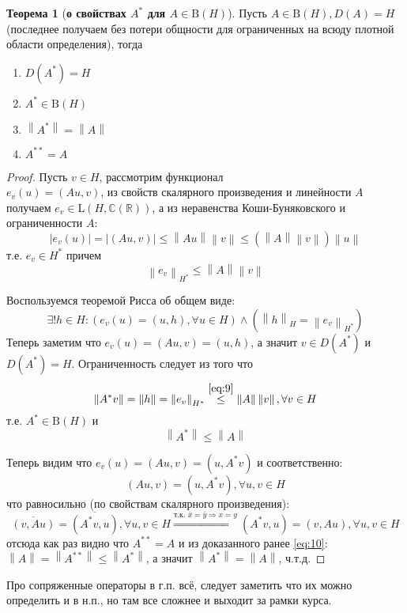 \documentclass[12pt,a4paper]{article}
\theoremstyle{definition}
\newtheorem{theorem}{Теорема}
\newcommand{\Real}{\mathbb{R}}
\newcommand{\Cmplx}{\mathbb{C}}
\newcommand{\norm}[1]{\left\lVert#1\right\rVert}
\newcommand{\boundedo}[1]{\textrm{B}(#1)}
\newcommand{\linear}[2]{\textrm{L}(#1, #2)}
\begin{document}
\begin{theorem}[\textbf{о свойствах $A^*$ для $A \in \boundedo{H}$}]
	Пусть $A \in \boundedo{H}, D(A) = H$ (последнее получаем без потери общности для ограниченных на всюду плотной области определения), тогда
	\begin{enumerate}
		\item $D(A^*) = H$
		\item $A^* \in \boundedo{H}$
		\item $\norm{A^*} = \norm{A}$
		\item $A^{**} = A$
	\end{enumerate}
\end{theorem}
\begin{proof}
	Пусть $v \in H$, рассмотрим функционал \\ $e_v(u) = (Au, v)$, из свойств скалярного произведения и линейности $A$ получаем $e_v \in \linear{H}{\Cmplx(\Real)}$, а из неравенства Коши-Буняковского и ограниченности $A$:
	$$|e_v (u)| = |(Au, v)| \leq \norm{Au}\norm{v} \leq (\norm{A}\norm{v})\norm{u}$$
	т.е. $e_v \in H^*$ причем 
	\begin{equation}\label{eq:9}
		\norm{e_v}_{H^*} \leq \norm{A}\norm{v}
	\end{equation}
	
	Воспользуемся теоремой Рисса об общем виде: $$\exists!h\in H: \left(e_v(u) = (u, h), \forall u \in H\right) \wedge \left(\norm{h}_H = \norm{e_v}_{H^*}\right) $$
	Теперь заметим что $e_v(u) = (Au, v) = (u, h)$, а значит $v \in D(A^*)$ и $D(A^*) = H$. Ограниченность следует из того что 
	$$\norm{A^* v} = \norm{h} = \norm{e_v}_{H^*} \overset{\eqref{eq:9}}{\leq} \norm{A}\norm{v}, \forall v \in H$$
	т.е. $A^* \in \boundedo{H}$ и
	\begin{equation}\label{eq:10}
		\norm{A^*} \leq \norm{A}
	\end{equation}
	
	Теперь видим что $e_v (u) = (Au, v) = (u, A^* v)$ и соответственно:
	$$(Au, v) = (u, A^* v), \forall u, v \in H$$
	что равносильно (по свойствам скалярного произведения):
	$$\overline{(v, Au)} = \overline{(A^* v, u)}, \forall u, v \in H \overset{\text{т.к. }\bar{x} = \bar{y} \Rightarrow x = y}{\Rightarrow} (A^* v, u) = (v, Au), \forall u, v \in H$$
	отсюда как раз видно что $A^{**} = A$ и из доказанного ранее \eqref{eq:10}: \\ $\norm{A} = \norm{A^{**}} \leq \norm{A^*}$, а значит $\norm{A^*} = \norm{A}$, ч.т.д.
\end{proof}
Про сопряженные операторы в г.п. всё, следует заметить что их можно определить и в н.п., но там все сложнее и выходит за рамки курса.
\end{document}
